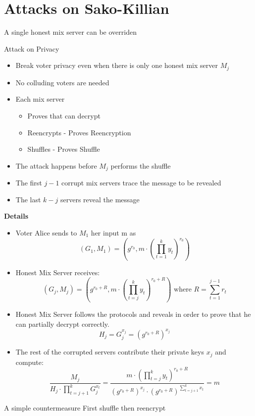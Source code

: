 \documentclass{beamer}
\begin{document}
\section{Attacks on Sako-Killian}

\begin{frame}[allowframebreaks]{A single honest mix server can be overriden}
\begin{block}{Attack on Privacy}
\begin{itemize}
\item Break voter privacy even when there is only one honest mix server $M_j$
\item No colluding voters are needed
\end{itemize}
\end{block}
\begin{itemize}
\item Each mix server
\begin{itemize}
\item Proves that can decrypt
\item Reencrypts - Proves Reencryption
\item Shuffles - Proves Shuffle
\end{itemize}
\item The attack happens before $M_j$ performs the shuffle
\item The first $j-1$ corrupt mix servers trace the message to be revealed
\item The last $k-j$ servers reveal the message
\end{itemize}
\framebreak

\textbf{Details}

\begin{itemize}
\item Voter Alice sends to $M_1$ her input m as
\[
(G_1,M_1) = (g^{r_0},m \cdot (\prod_{t=1}^{k} y_t)^{r_0})
\]

\item Honest Mix Server receives: 
\[
 (G_j,M_j) = (g^{r_0+R},m \cdot (\prod_{t=j}^{k} y_t)^{r_0+R}) \text{ where } R=\sum_{t=1}^{j-1} r_t
\]

\item Honest Mix Server follows the protocols and reveals in order to prove that he can partially decrypt correctly.
\[
H_j = G_{j}^{x_j} = (g^{r_0+R})^{x_j} 
\]


\item The rest of the corrupted servers contribute their private keys $x_j$ and compute:
\[
\frac{M_j}{H_j \cdot \prod_{t=j+1}^{k} G_{j}^{x_t}} = \frac {m \cdot (\prod_{t=j}^{k} y_t)^{r_0+R}} {(g^{r_0+R})^{x_j} \cdot  (g^{r_0+R})^{\sum_{t=j+1}^{k} x_t}} = m
\]
\end{itemize}

\begin{block}{A simple countermeasure}
First shuffle then reencrypt
\end{block}

\end{frame}
\end{document}
